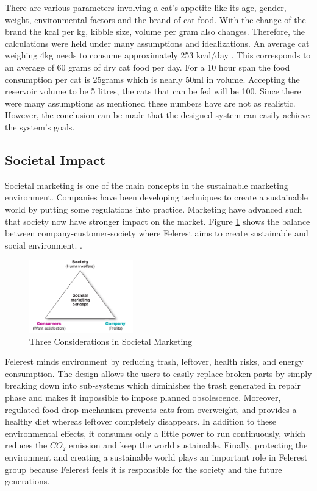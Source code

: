 There are various parameters involving a cat's appetite like its age, gender, weight, environmental factors and the brand of cat food. With the change of the brand the kcal per kg, kibble  size, volume per gram also changes. Therefore, the calculations were held under many assumptions and idealizations. An average cat weighing 4kg needs to consume approximately 253 kcal/day \cite{cite:DIET}. This corresponds to an average of 60 grams of dry cat food per day. For a 10 hour span the food consumption per cat is 25grams which is nearly 50ml in volume. Accepting the reservoir volume to be 5 litres, the cats that can be fed will be 100. Since there were many assumptions as mentioned these numbers have are not as realistic. However, the conclusion can be made that the designed system can easily achieve the system's goals. 

\subsection{Societal Impact}
Societal marketing is one of the main concepts in the sustainable marketing environment. Companies have been developing techniques to create a sustainable world by putting some regulations into practice. Marketing have advanced such that society now have stronger impact on the market. Figure \ref{fig:intro_societalMarketing} shows the balance between company-customer-society where Felerest aims to create sustainable and social environment. \cite{bib:intro_societalMarketing}.


\begin{figure}
    \centering
    \includegraphics[width=0.4\textwidth]{img/intro_societalMarketingTriangle.png}
    \caption{\scriptsize Three Considerations in Societal Marketing \cite{bib:intro_societalMarketing}}
    \label{fig:intro_societalMarketing}
\end{figure}

Felerest minds environment by reducing trash, leftover, health risks, and energy consumption. The design allows the users to easily replace broken parts by simply breaking down into sub-systems which diminishes the trash generated in repair phase and makes it impossible to impose planned obsolescence. Moreover, regulated food drop mechanism prevents cats from overweight, and provides a healthy diet whereas leftover completely disappears. In addition to these environmental effects, it consumes only a little power to run continuously, which reduces the $CO_2$ emission and keep the world sustainable. Finally, protecting the environment and creating a sustainable world plays an important role in Felerest group because Felerest feels it is responsible for the society and the future generations.
